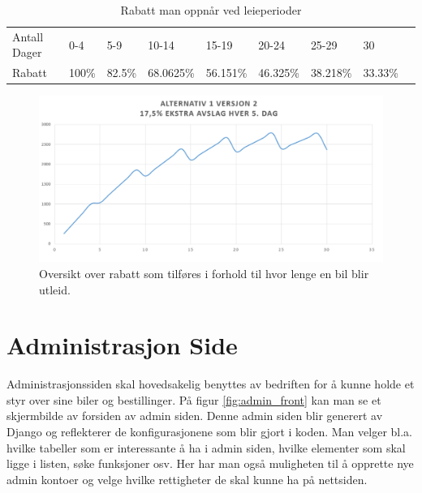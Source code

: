 \begin{table}[htbp]
\centering
\caption{Rabatt man oppnår ved leieperioder}
\label{table:percent}
\begin{tabular}{|l|l|l|l|l|l|l|l|l}
\cline{1-8}
Antall Dager & 0-4   & 5-9    & 10-14     & 15-19    & 20-24    & 25-29    & 30      &  \\ \cline{1-8}
Rabatt       & 100\% & 82.5\% & 68.0625\% & 56.151\% & 46.325\% & 38.218\% & 33.33\% &  \\ \cline{1-8}
\end{tabular}
\end{table}



 \begin{figure}[htbp]
	\centering
		\includegraphics[scale=0.5]{Bilder/avslag.png}
	\caption[Utleiepris Diagram]{Oversikt over rabatt som tilføres i forhold til hvor lenge en bil blir utleid. } %
	\label{fig:price_reduction}
\end{figure}


\clearpage
\section{Administrasjon Side}
Administrasjonssiden skal hovedsakelig benyttes av bedriften for å kunne holde et styr over sine biler og bestillinger. På figur \ref{fig:admin_front} kan man se et skjermbilde av forsiden av admin siden. Denne admin siden blir generert av Django og reflekterer de konfigurasjonene som blir gjort i koden. Man velger bl.a. hvilke tabeller som er interessante å ha i admin siden, hvilke elementer som skal ligge i listen, søke funksjoner osv. Her har man også muligheten til å opprette nye admin kontoer og velge hvilke rettigheter de skal kunne ha på nettsiden.

